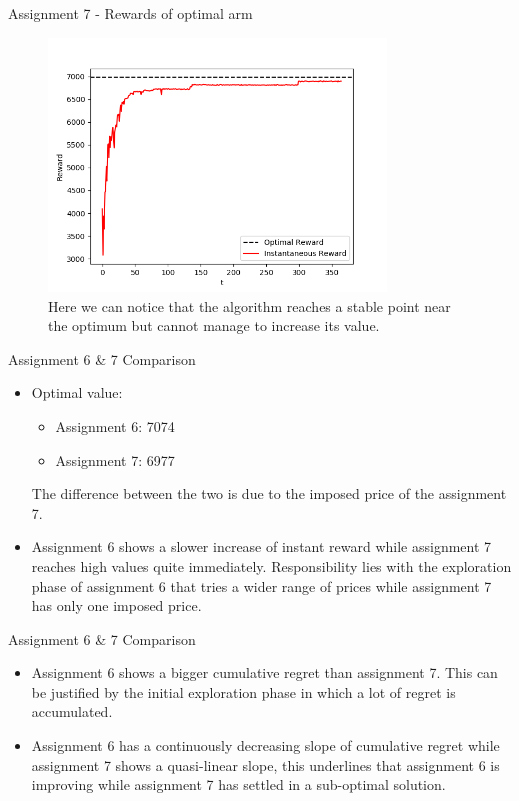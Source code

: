 \documentclass[11pt]{beamer}
\begin{document}
\begin{frame}{Assignment 7 - Rewards of optimal arm}
\begin{figure}[hbtp]
\centering
\includegraphics[width=0.8\textwidth]{images/assignment_7_regrets_arm_3_inst_reward.png}
\caption{Here we can notice that the algorithm reaches a stable point near the optimum but cannot manage to increase its value.}
\end{figure}
\end{frame}

\begin{frame}{Assignment 6 \& 7 Comparison}
	\begin{itemize}
		\item Optimal value:
		\begin{itemize}
			\item Assignment 6: 7074
			\item Assignment 7: 6977
		\end{itemize}
		The difference between the two is due to the imposed price of the assignment 7.
		\item Assignment 6 shows a slower increase of instant reward while assignment 7 reaches high values quite immediately. Responsibility lies with the exploration phase of assignment 6 that tries a wider range of prices while assignment 7 has only one imposed price.
	\end{itemize}
\end{frame}

\begin{frame}{Assignment 6 \& 7 Comparison}
	\begin{itemize}
		\item Assignment 6 shows a bigger cumulative regret than assignment 7. This can be justified by the initial exploration phase in which a lot of regret is accumulated.
		\item Assignment 6 has a continuously decreasing slope of cumulative regret while assignment 7 shows a quasi-linear slope, this underlines that assignment 6 is improving while assignment 7 has settled in a sub-optimal solution.
	\end{itemize}
\end{frame}
\end{document}
